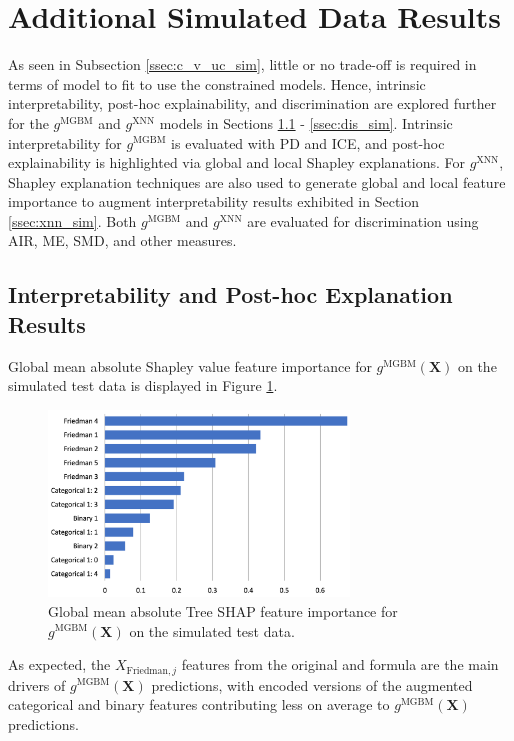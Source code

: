 \documentclass[information,article,submit,moreauthors,pdftex]{definitions/mdpi}
\begin{document}
\section{Additional Simulated Data Results}\label{a_sec:res_sim}

As seen in Subsection \ref{ssec:c_v_uc_sim}, little or no trade-off is required in terms of model to fit to use the constrained models. Hence, intrinsic interpretability, post-hoc explainability, and discrimination are explored further for the $g^\text{MGBM}$ and $g^\text{XNN}$ models in Sections \ref{ssec:int_ex_sim} - \ref{ssec:dis_sim}. Intrinsic interpretability for $g^\text{MGBM}$ is evaluated with PD and ICE, and post-hoc explainability is highlighted via global and local Shapley explanations. For $g^\text{XNN}$, Shapley explanation techniques are also used to generate global and local feature importance to augment interpretability results exhibited in Section \ref{ssec:xnn_sim}. Both $g^\text{MGBM}$ and $g^\text{XNN}$ are evaluated for discrimination using AIR, ME, SMD, and other measures.

\subsection{Interpretability and Post-hoc Explanation Results}\label{ssec:int_ex_sim}

Global mean absolute Shapley value feature importance for $g^{\text{MGBM}}(\mathbf{X})$ on the simulated test data is displayed in Figure \ref{fig:sim_mgbm_glob}. 

\begin{figure}[htb]
	\centering
	\includegraphics[width=8cm]{img/sim_mgbm_glob.png}
	\caption{Global mean absolute Tree SHAP feature importance for $g^\text{MGBM}(\mathbf{X})$ on the simulated test data.}
	\label{fig:sim_mgbm_glob}
\end{figure}  

\noindent As expected, the $X_{\text{Friedman},j}$ features from the original \citet{friedman1979tree} and \citet{friedman1991multivariate} formula are the main drivers of $g^\text{MGBM}(\mathbf{X})$ predictions, with encoded versions of the augmented categorical and binary features contributing less on average to $g^\text{MGBM}(\mathbf{X})$ predictions. 
\end{document}
